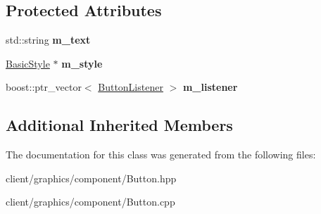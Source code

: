 \subsection*{Protected Attributes}
\begin{DoxyCompactItemize}
\item 
\hypertarget{classgraphics_1_1_button_ae2b7ae5146ded929b9d659d7bf9e97b8}{std\-::string {\bfseries m\-\_\-text}}\label{classgraphics_1_1_button_ae2b7ae5146ded929b9d659d7bf9e97b8}

\item 
\hypertarget{classgraphics_1_1_button_ade707e6fbba545889689aca382f94bf9}{\hyperlink{classgraphics_1_1_basic_style}{Basic\-Style} $\ast$ {\bfseries m\-\_\-style}}\label{classgraphics_1_1_button_ade707e6fbba545889689aca382f94bf9}

\item 
\hypertarget{classgraphics_1_1_button_a8b2f276fa3630e3c63a46729cd43a6b4}{boost\-::ptr\-\_\-vector$<$ \hyperlink{classgraphics_1_1_button_listener}{Button\-Listener} $>$ {\bfseries m\-\_\-listener}}\label{classgraphics_1_1_button_a8b2f276fa3630e3c63a46729cd43a6b4}

\end{DoxyCompactItemize}
\subsection*{Additional Inherited Members}


The documentation for this class was generated from the following files\-:\begin{DoxyCompactItemize}
\item 
client/graphics/component/Button.\-hpp\item 
client/graphics/component/Button.\-cpp\end{DoxyCompactItemize}
